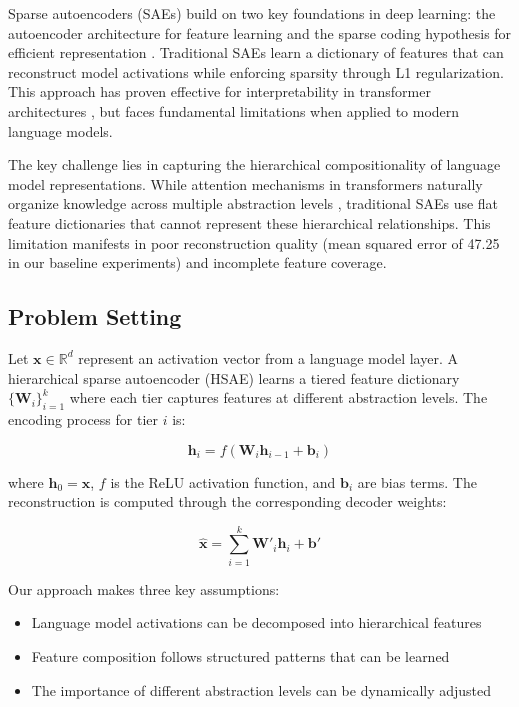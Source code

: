 \documentclass{article} %
\begin{document}
Sparse autoencoders (SAEs) build on two key foundations in deep learning: the autoencoder architecture for feature learning \cite{goodfellow2016deep} and the sparse coding hypothesis for efficient representation \cite{radford2019language}. Traditional SAEs learn a dictionary of features that can reconstruct model activations while enforcing sparsity through L1 regularization. This approach has proven effective for interpretability in transformer architectures \cite{vaswani2017attention}, but faces fundamental limitations when applied to modern language models.

The key challenge lies in capturing the hierarchical compositionality of language model representations. While attention mechanisms in transformers naturally organize knowledge across multiple abstraction levels \cite{vaswani2017attention}, traditional SAEs use flat feature dictionaries that cannot represent these hierarchical relationships. This limitation manifests in poor reconstruction quality (mean squared error of 47.25 in our baseline experiments) and incomplete feature coverage.

\subsection{Problem Setting}
\label{subsec:problem_setting}

Let $\mathbf{x} \in \mathbb{R}^d$ represent an activation vector from a language model layer. A hierarchical sparse autoencoder (HSAE) learns a tiered feature dictionary $\{\mathbf{W}_i\}_{i=1}^k$ where each tier captures features at different abstraction levels. The encoding process for tier $i$ is:

\begin{equation}
    \mathbf{h}_i = f(\mathbf{W}_i\mathbf{h}_{i-1} + \mathbf{b}_i)
\end{equation}

where $\mathbf{h}_0 = \mathbf{x}$, $f$ is the ReLU activation function, and $\mathbf{b}_i$ are bias terms. The reconstruction is computed through the corresponding decoder weights:

\begin{equation}
    \hat{\mathbf{x}} = \sum_{i=1}^k \mathbf{W}'_i\mathbf{h}_i + \mathbf{b}'
\end{equation}

Our approach makes three key assumptions:
\begin{itemize}
    \item Language model activations can be decomposed into hierarchical features
    \item Feature composition follows structured patterns that can be learned
    \item The importance of different abstraction levels can be dynamically adjusted
\end{itemize}
\end{document}
